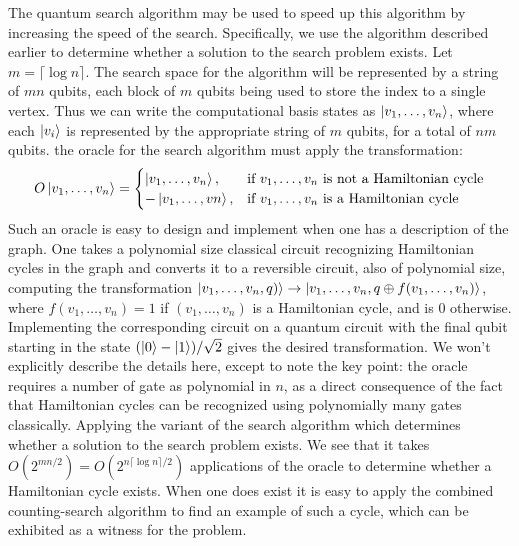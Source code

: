 The quantum search algorithm may be used to speed up this algorithm by increasing the speed of the search. Specifically, we use the algorithm described earlier to determine whether a solution to the search problem exists. Let $m=\lceil \log n\rceil$. The search space for the algorithm will be represented by a string of $mn$ qubits, each block of $m$ qubits being used to store the index to a single vertex. Thus we can write the computational basis states as $\ket{v_1,\ldots,v_n}$, where each $\ket{v_i}$ is represented by the appropriate string of $m$ qubits, for a total of $nm$ qubits. the oracle for the search algorithm must apply the transformation:
\[
O\ket{v_1,\ldots,v_n} = \begin{cases} \ket{v_1,\ldots,v_n}, &\text{if $v_1,\ldots,v_n$ is not a Hamiltonian cycle}\\ -\ket{v_1,\ldots,vn}, &\text{if $v_1,\ldots,v_n$ is a Hamiltonian cycle} \end{cases}
\]
Such an oracle is easy to design and implement when one has a description of the graph. One takes a polynomial size classical circuit recognizing Hamiltonian cycles in the graph and converts it to a reversible circuit, also of polynomial size, computing the transformation $\ket{v_1,\ldots,v_n,q)} \rightarrow \ket{v_1,\ldots,v_n,q\oplus f(v_1,\ldots,v_n)}$, where $f(v_1,\ldots,v_n)=1$ if $(v_1,\ldots,v_n)$ is a Hamiltonian cycle, and is $0$ otherwise. Implementing the corresponding circuit on a quantum circuit with the final qubit starting in the state $(\ket{0}-\ket{1})/\sqrt{2}$ gives the desired transformation. We won't explicitly describe the details here, except to note the key point: the oracle requires a number of gate as polynomial in $n$, as a direct consequence of the fact that Hamiltonian cycles can be recognized using polynomially many gates classically. Applying the variant of the search algorithm which determines whether a solution to the search problem exists. We see that it takes $O(2^{mn/2})=O(2^{n\lceil \log n\rceil/2})$ applications of the oracle to determine whether a Hamiltonian cycle exists. When one does exist it is easy to apply the combined counting-search algorithm to find an example of such a cycle, which can be exhibited as a witness for the problem.

